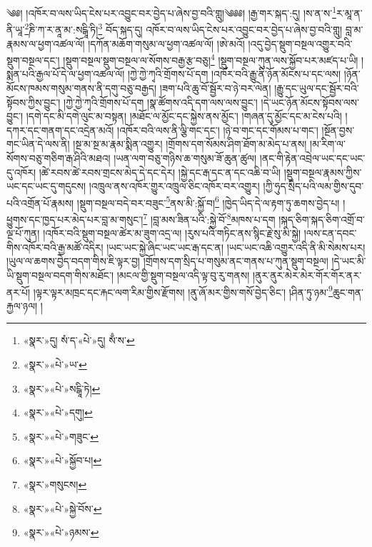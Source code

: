 ༄༅། །འཁོར་བ་ལས་ཡིད་ངེས་པར་འབྱུང་བར་བྱེད་པ་ཞེས་བྱ་བའི་གླུ།༄༅༅། །རྒྱ་གར་སྐད་:དུ། །ས་ན་ས་\footnote{«སྣར་»དུ། སཾ་ད་«པེ་»དུ། སྃ་ས་}ར་མཱ་ན་ནི་ཡཱ་\footnote{«སྣར་»«པེ་»ཡ་}ཎི་ཀ་ར་ནཱ་མ་:སངྒཱི་ཏི།\footnote{«སྣར་»«པེ་»སངྒཱི་ཏེ།} བོད་སྐད་དུ། འཁོར་བ་ལས་ཡིད་ངེས་པར་འབྱུང་བར་བྱེད་པ་ཞེས་བྱ་བའི་གླུ། བླ་མ་རྣམས་ལ་ཕྱག་འཚལ་ལོ། །དཀོན་མཆོག་གསུམ་ལ་ཕྱག་འཚལ་ལོ། །ཨེ་མའོ། །འདུ་བྱེད་སྡུག་བསྔལ་འགྱུར་བའི་སྡུག་བསྔལ་དང་། །སྡུག་བསྔལ་སྡུག་བསྔལ་ལ་སོགས་བརྒྱ་རྩ་བཅུ།\footnote{«སྣར་»«པེ་»དགུ།} །སྡུག་བསྔལ་ཀུན་ལས་སྐྱོབ་པར་མཛད་པ་ཡི། །སྨན་པའི་རྒྱལ་པོ་དེ་ལ་ཕྱག་འཚལ་ལོ། །ཀྱེ་ཀྱེ་ཀྭའི་གྲོགས་པོ་དག །འཁོར་བའི་རྒྱུ་ནི་ཉོན་མོངས་པ་དང་ལས། །ཉོན་མོངས་ཁམས་གསུམ་གནས་ནི་དགུ་བཅུ་བརྒྱད། །ཟག་པའི་ཆུ་བོ་སྦྱོར་བ་ཉེ་བར་ལེན། །རྒྱུ་དང་ཡུལ་དང་སྦྱོར་བའི་སྟོབས་ཀྱིས་བྱུང་། །ཀྱེ་ཀྱེ་ཀྭའི་གྲོགས་པོ་དག །སྣ་ཚོགས་འདི་དག་ལས་ལས་བྱུང་། །དེ་ཡང་ཉོན་མོངས་སྟོབས་ལས་བྱུང་། །དགེ་དང་མི་དགེ་ལུང་མ་བསྟན། །མཐོང་ལ་མྱོང་དང་སྐྱེས་ནས་མྱོང་། །གཞན་དུ་མྱོང་དང་མ་ངེས་པའི། །དཀར་དང་གནག་དང་འདྲེན་མའོ། །འཁོར་བའི་ལས་ནི་ལྕི་གང་དང་། །ཉེ་བ་གང་དང་གོམས་པ་གང་། །སྔོན་བྱས་གང་ཡིན་དེ་ལས་ནི། །སྔ་མ་སྔ་མ་རྣམ་སྨིན་འགྱུར། །གྲོགས་དག་སོམས་ཤིག་ཐོག་མ་མེད་པ་ནས། །མ་རིག་ལ་སོགས་བཅུ་གཅིག་རྒ་ཤིའི་མཐའ། །ཡན་ལག་བཅུ་གཉིས་ཆ་གསུམ་ཟོ་ཆུན་ཚུལ། །ནང་གི་རྟེན་འབྲེལ་ཡང་དང་ཡང་དུ་འཁོར། །ཚེ་རབས་ཚེ་རབས་གྲངས་མེད་དེ་དང་དེར། །སྐྱེ་དང་རྒ་དང་ན་དང་འཆི་བ་ཡི། །སྡུག་བསྔལ་རྣམས་ཀྱིས་ཡང་དང་ཡང་དུ་གདུངས། །འཁྲུལ་ནས་འཁོར་གྱུར་འཁྲུལ་ཅིང་འཁོར་བར་འགྱུར། །ཀྱི་ཧུད་སྲིད་པའི་ལམ་གྱིས་དུབ་པའི་འགྲོན་པོ་རྣམས། །སྡུག་བསྔལ་བདེ་བར་བཟུང་\footnote{«སྣར་»«པེ་»གཟུང་}ནས་མི་:སྐྱོ་བ།\footnote{«སྣར་»«པེ་»སྐྱོབ་པ།} །ཁྱེད་ཡིད་དེ་ལ་རྟག་ཏུ་ཆགས་བྱེད་པ། །ཕྱུགས་དང་ཁྱད་པར་མེད་པར་བླ་མ་གསུང་།\footnote{«སྣར་»གསུངས།} །བླ་མས་ཟིན་པའི་:སྐྱེ་བོ་\footnote{«སྣར་»«པེ་»སྐྱེ་བོས་}མཁས་པ་དག །སྐད་ཅིག་སྐད་ཅིག་འགྲོ་བ་ལྔ་པོ་ཀུན། །འཁོར་བའི་སྡུག་བསྔལ་ཚེར་མ་ཟུག་འདྲ་ལ། །རུས་པའི་གཏིང་ནས་སྙིང་རྗེ་སུ་མི་སྐྱེ། །ལས་ངན་དབང་གིས་འཁོར་བའི་རྒྱ་མཚོ་འདིར། །ཡང་ཡང་སྐྱེ་ཞིང་ཡང་ཡང་རྒ་དང་ན། །ཡང་ཡང་འཆི་འགྱུར་འདི་ནི་མི་སེམས་པར། །ཡུལ་ལ་ཆགས་བྱེད་བདག་གིས་ཇི་ལྟར་བྱ། །གྲོགས་དག་སྲིད་པ་གསུམ་ནང་གནས་པ་ཀུན་སྡུག་བསྔལ། །དེ་ཡང་མི་ཡི་སྡུག་བསྔལ་བདག་གིས་མཐོང་། །མངལ་གྱི་སྡུག་བསྔལ་འདི་ལྟ་བུ་རུ་གནས། །ནུར་ནུར་མེར་མེར་གོར་གོར་ནར་ནར་པོ། །ལྟར་ལྟར་མཁྲང་དང་རྐང་ལག་རིམ་གྱིས་རྫོགས། །ནུ་ཞོ་མར་གྱིས་གསོ་བྱེད་ཅིང་། །ཤིན་ཏུ་ཉམ་\footnote{«སྣར་»«པེ་»ཉམས་}ཆུང་གན་རྐྱལ་ཉལ། །
